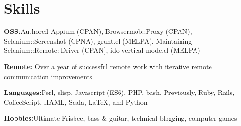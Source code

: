 \section{Skills}
%
\begin{position}
\item[] \textbf{OSS:}\quad Authored Appium (CPAN), Browsermob::Proxy (CPAN), Selenium::Screenshot (CPNA), grunt.el (MELPA). Maintaining Selenium::Remote::Driver (CPAN), ido-vertical-mode.el (MELPA)
\item[] \textbf{Remote:} Over a year of successful remote work with iterative remote communication improvements
\item[] \textbf{Languages:}\quad  Perl, elisp, Javascript (ES6), PHP, bash. Previously, Ruby, Rails, CoffeeScript, HAML, Scala, \LaTeX, and Python%
\item[] \textbf{Hobbies:}\quad Ultimate Frisbee, bass \& guitar, technical blogging, computer games
\end{position}
